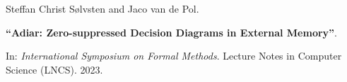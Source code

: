 Steffan Christ Sølvsten and Jaco van de Pol.

{\bf ``Adiar: Zero-suppressed Decision Diagrams in External Memory''}.

In: \emph{International Symposium on Formal Methods}. Lecture Notes in Computer
Science (LNCS). 2023.

\label{cite:2023.fm}